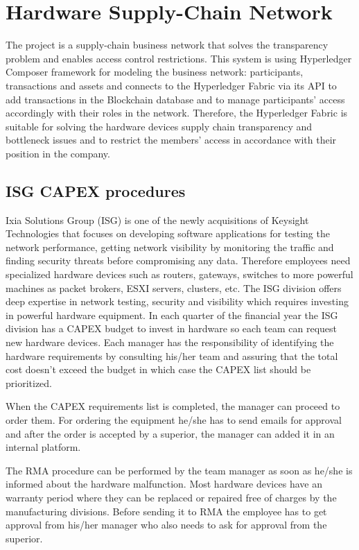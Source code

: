 \chapter{Hardware Supply-Chain Network}
\label{chapter:chapter4}
The \textbf{\emph{\project}} project is a supply-chain business network that solves the transparency problem and enables access control restrictions.
This system is using Hyperledger Composer framework for modeling the business network: participants, transactions and assets and connects to the Hyperledger Fabric via its API to add transactions in the Blockchain database and to manage participants' access accordingly with their roles in the network.
Therefore, the Hyperledger Fabric is suitable for solving the hardware devices supply chain transparency and bottleneck issues and to restrict the members' access in accordance with their position in the company.


\section{ISG CAPEX procedures}
\label{sec:chapter4-section1}

Ixia Solutions Group (ISG) is one of the newly acquisitions of Keysight Technologies that focuses on developing software applications for testing the network performance, getting network visibility by monitoring the traffic and finding security threats before compromising any data.
Therefore employees need specialized hardware devices such as routers, gateways, switches to more powerful machines as packet brokers, ESXI servers, clusters, etc.
The ISG division offers deep expertise in network testing, security and visibility which requires investing in powerful hardware equipment.
In each quarter of the financial year the ISG division has a CAPEX budget to invest in hardware so each team can request new hardware devices.
Each manager has the responsibility of identifying the hardware requirements by consulting his/her team and assuring that the total cost doesn't exceed the budget in which case the CAPEX list should be prioritized.

When the CAPEX requirements list is completed, the manager can proceed to order them.
For ordering the equipment he/she has to send emails for approval and after the order is accepted by a superior, the manager can added it in an internal platform.

The RMA procedure can be performed by the team manager as soon as he/she is informed about the hardware malfunction. Most hardware devices have an warranty period where they can be replaced or repaired free of charges by the manufacturing divisions. Before sending it to RMA the employee has to get approval from his/her manager who also needs to ask for approval from the superior.

